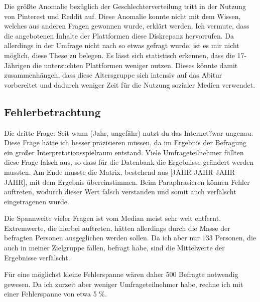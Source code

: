 Die größte Anomalie bezüglich der Geschlechterverteilung tritt in der Nutzung von Pinterest und Reddit auf. Diese Anomalie konnte 
nicht mit dem Wissen, welches aus anderen Fragen gewonnen wurde, erklärt werden. Ich vermute, dass die angebotenen Inhalte der 
Plattformen diese Diskrepanz hervorrufen.
Da allerdings in der Umfrage nicht nach so etwas gefragt wurde, ist es mir nicht möglich, diese These zu belegen.
Es lässt sich statistisch erkennen, dass die 17-Jährigen die untersuchten Plattformen weniger nutzen. Dieses könnte damit zusammenhängen, dass diese Altersgruppe sich intensiv auf das Abitur vorbereitet und dadurch weniger Zeit für die Nutzung sozialer Medien verwendet.

\subsection{Fehlerbetrachtung}

Die dritte Frage: \glqq Seit wann (Jahr, ungefähr) nutzt du das Internet?\grqq \nobreakspace war ungenau. Diese Frage hätte ich 
besser präzisieren müssen, da im Ergebnis der Befragung ein großer Interpretationsspielraum entstand.
Viele Umfrageteilnehmer füllten diese Frage falsch aus, so dass für die Datenbank die Ergebnisse geändert werden mussten. 
Am Ende musste die Matrix, bestehend aus [JAHR JAHR JAHR JAHR], mit dem Ergebnis übereinstimmen. Beim Paraphrasieren können Fehler
auftreten, wodurch dieser Wert falsch verstanden und somit auch verfälscht eingetragenen wurde.

Die Spannweite vieler Fragen ist vom Median meist sehr weit entfernt. Extremwerte, die hierbei auftreten, hätten allerdings durch die
Masse der befragten Personen ausgeglichen werden sollen. Da ich aber nur 133 Personen, die auch in meiner Zielgruppe fallen, befragt habe,
sind die Mittelwerte der Ergebnisse verfälscht.

Für eine möglichst kleine Fehlerspanne wären daher 500 Befragte 
\footnotemark{} notwendig gewesen. Da ich zurzeit 
aber weniger Umfrageteilnehmer habe, rechne ich mit einer Fehlerspanne von etwa 5 \%.